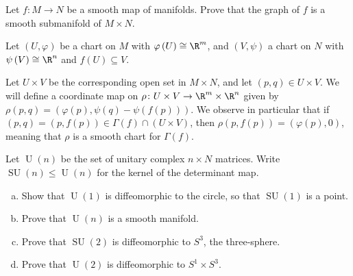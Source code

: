 \documentclass[10pt]{mypackage}
\begin{document}
\RaggedRight
\begin{problem}[Problem 1]
  Let $f\colon M\rightarrow N$ be a smooth map of manifolds. Prove that the graph of $f$ is a smooth submanifold of $M\times N$.
\end{problem}
\begin{solution}
  Let $\left( U,\varphi \right)$ be a chart on $M$ with $\varphi\left( U \right)\cong \R^{m}$, and $\left( V,\psi \right)$ a chart on $N$ with $\psi\left( V \right)\cong \R^{n}$ and $f\left( U \right)\subseteq V$.\newline

  Let $U\times V$ be the corresponding open set in $M\times N$, and let $\left( p,q \right)\in U\times V$. We will define a coordinate map on $\rho\colon U\times V\rightarrow \R^{m}\times \R^{n}$ given by $\rho\left( p,q \right) = \left( \varphi(p),\psi(q) - \psi\left( f(p) \right) \right)$. We observe in particular that if $\left( p,q \right) = \left( p,f(p) \right)\in \Gamma(f)\cap \left( U\times V \right)$, then $\rho\left( p,f(p) \right) = \left( \varphi(p),0 \right)$, meaning that $\rho$ is a smooth chart for $\Gamma(f)$.
\end{solution}
\begin{problem}[Problem 2]
  Let $\operatorname{U}(n)$ be the set of unitary complex $n\times N$ matrices. Write $\operatorname{SU}\left( n \right)\leq \operatorname{U}(n)$ for the kernel of the determinant map.
  \begin{enumerate}[(a)]
    \item Show that $\operatorname{U}(1)$ is diffeomorphic to the circle, so that $\operatorname{SU}(1)$ is a point.
    \item Prove that $\operatorname{U}(n)$ is a smooth manifold.
    \item Prove that $\operatorname{SU}(2)$ is diffeomorphic to $S^{3}$, the three-sphere.
    \item Prove that $\operatorname{U}(2)$ is diffeomorphic to $S^{1}\times S^{3}$.
  \end{enumerate}
\end{problem}
\end{document}
